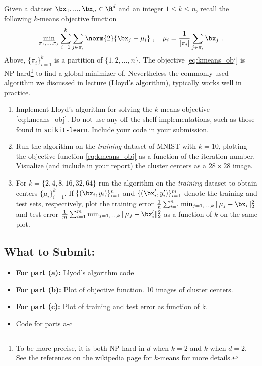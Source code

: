 \documentclass{article}
\begin{document}
\begin{aprob}
Given a dataset $\bx_1,..., \bx_n \in \R^{d}$ and an integer $1 \leq k \leq n$, recall the following $k$-means objective function
\begin{align}
    \min_{\pi_1, ..., \pi_k} \sum_{i=1}^{k} \sum_{j \in \pi_i} \norm{2}{ \bx_j - \mu_{i} } \ , \quad \mu_i = \frac{1}{|\pi_i|} \sum_{j \in \pi_i} \bx_j \ . \label{eq:kmeans_obj}
\end{align}
Above, $\{\pi_i\}_{i=1}^{k}$ is a partition of $\{1, 2, ..., n\}$. The objective \eqref{eq:kmeans_obj} is NP-hard\footnote{
To be more precise, it is both NP-hard in $d$ when $k=2$ and $k$ when $d=2$. See the references on the wikipedia page for $k$-means for more details.} to find a global minimizer of. Nevertheless the commonly-used algorithm we discussed in lecture (Lloyd's algorithm), typically works well in practice.

\medskip


\begin{enumerate}
    \item {} Implement Lloyd's algorithm for solving the $k$-means objective \eqref{eq:kmeans_obj}. Do not use any off-the-shelf implementations, such as those found in \texttt{scikit-learn}. Include your code in your submission.
    
    \item {} Run the algorithm on the \emph{training} dataset of MNIST with $k=10$, plotting the objective function \eqref{eq:kmeans_obj} as a function of the iteration number. Visualize (and include in your report) the cluster centers as a $28\times 28$ image.

    \item {} For $k=\{2, 4, 8, 16, 32, 64\}$ run the algorithm on the \emph{training} dataset to obtain centers $\{\mu_{i}\}_{i=1}^k$. If $\{(\bx_i,y_i)\}_{i=1}^n$ and $\{(\bx_i',y_i')\}_{i=1}^m$ denote the training and test sets, respectively, plot the training error $\frac{1}{n} \sum_{i=1}^n \min_{j=1,\dots,k} \| \mu_j - \bx_i \|_2^2$ and test error $\frac{1}{m} \sum_{i=1}^m \min_{j=1,\dots,k} \| \mu_j - \bx_i' \|_2^2$ as a function of $k$ on the same plot.
\end{enumerate}
 \subsection*{What to Submit:}
    \begin{itemize}
        \item \textbf{For part (a):} Llyod’s algorithm code
        \item \textbf{For part (b):} Plot of objective function. 10 images of cluster centers.
        \item \textbf{For part (c):} Plot of training and test error as function of k.
        \item Code for parts a-c
    \end{itemize}


\end{aprob}
\end{document}
